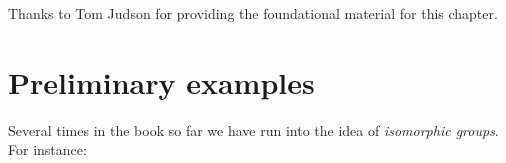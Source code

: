 
Thanks to Tom Judson for providing the foundational material for this chapter.

\section{Preliminary examples}
\label{sec:isomorph_defn_ex}

Several times in the book so far we have run into the idea of  \emph{isomorphic groups}.  For instance:

